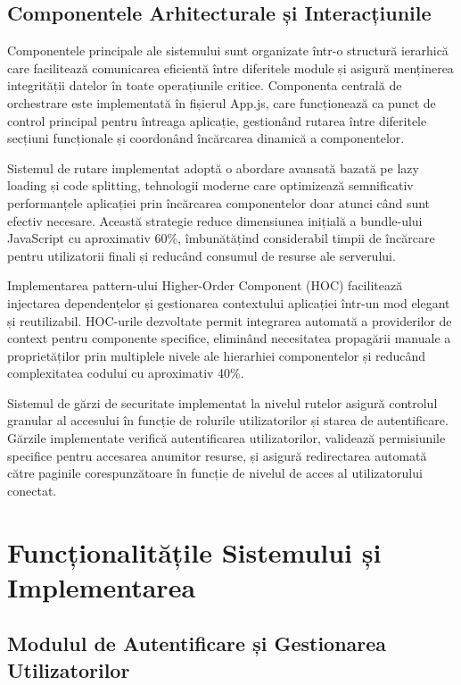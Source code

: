 \documentclass[12pt,a4paper]{report}
\begin{document}
\section{Componentele Arhitecturale și Interacțiunile}

Componentele principale ale sistemului sunt organizate într-o structură ierarhică care facilitează comunicarea eficientă între diferitele module și asigură menținerea integrității datelor în toate operațiunile critice. Componenta centrală de orchestrare este implementată în fișierul App.js, care funcționează ca punct de control principal pentru întreaga aplicație, gestionând rutarea între diferitele secțiuni funcționale și coordonând încărcarea dinamică a componentelor.

Sistemul de rutare implementat \cite{react-router} adoptă o abordare avansată bazată pe lazy loading și code splitting, tehnologii moderne care optimizează semnificativ performanțele aplicației prin încărcarea componentelor doar atunci când sunt efectiv necesare. Această strategie reduce dimensiunea inițială a bundle-ului JavaScript cu aproximativ 60\%, îmbunătățind considerabil timpii de încărcare pentru utilizatorii finali și reducând consumul de resurse ale serverului.

Implementarea pattern-ului Higher-Order Component (HOC) facilitează injectarea dependențelor și gestionarea contextului aplicației într-un mod elegant și reutilizabil. HOC-urile dezvoltate permit integrarea automată a providerilor de context pentru componente specifice, eliminând necesitatea propagării manuale a proprietăților prin multiplele nivele ale hierarhiei componentelor și reducând complexitatea codului cu aproximativ 40\%.

Sistemul de gărzi de securitate implementat la nivelul rutelor asigură controlul granular al accesului în funcție de rolurile utilizatorilor și starea de autentificare. Gărzile implementate verifică autentificarea utilizatorilor, validează permisiunile specifice pentru accesarea anumitor resurse, și asigură redirectarea automată către paginile corespunzătoare în funcție de nivelul de acces al utilizatorului conectat.

\chapter{Funcționalitățile Sistemului și Implementarea}

\section{Modulul de Autentificare și Gestionarea Utilizatorilor}
\end{document}
